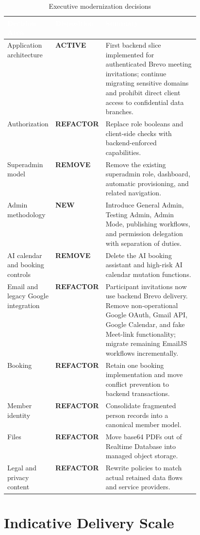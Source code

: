 \documentclass[11pt,a4paper,oneside]{report}
\newcommand{\statusactive}{\textcolor{notegreen}{\textbf{ACTIVE}}}
\newcommand{\statusrefactor}{\textcolor{accent!80!black}{\textbf{REFACTOR}}}
\newcommand{\statusremove}{\textcolor{warnred}{\textbf{REMOVE}}}
\newcommand{\statusnew}{\textcolor{secondary}{\textbf{NEW}}}
\begin{document}
\begin{table}[H]
\centering
{}
\begin{tabularx}{\linewidth}{@{}p{0.25\linewidth} p{0.21\linewidth} X@{}}
\toprule
\rowcolor{primary}
\textcolor{white}{\textbf{Decision Area}} & \textcolor{white}{\textbf{Disposition}} & \textcolor{white}{\textbf{Summary}} \\
\midrule
Application architecture & \statusactive & First backend slice implemented for authenticated Brevo meeting invitations; continue migrating sensitive domains and prohibit direct client access to confidential data branches. \\
Authorization & \statusrefactor & Replace role booleans and client-side checks with backend-enforced capabilities. \\
Superadmin model & \statusremove & Remove the existing superadmin role, dashboard, automatic provisioning, and related navigation. \\
Admin methodology & \statusnew & Introduce General Admin, Testing Admin, Admin Mode, publishing workflows, and permission delegation with separation of duties. \\
AI calendar and booking controls & \statusremove & Delete the AI booking assistant and high-risk AI calendar mutation functions. \\
Email and legacy Google integration & \statusrefactor & Participant invitations now use backend Brevo delivery. Remove non-operational Google OAuth, Gmail API, Google Calendar, and fake Meet-link functionality; migrate remaining EmailJS workflows incrementally. \\
Booking & \statusrefactor & Retain one booking implementation and move conflict prevention to backend transactions. \\
Member identity & \statusrefactor & Consolidate fragmented person records into a canonical member model. \\
Files & \statusrefactor & Move base64 PDFs out of Realtime Database into managed object storage. \\
Legal and privacy content & \statusrefactor & Rewrite policies to match actual retained data flows and service providers. \\
\bottomrule
\end{tabularx}
\caption{Executive modernization decisions}
\end{table}

\section{Indicative Delivery Scale}
\end{document}
